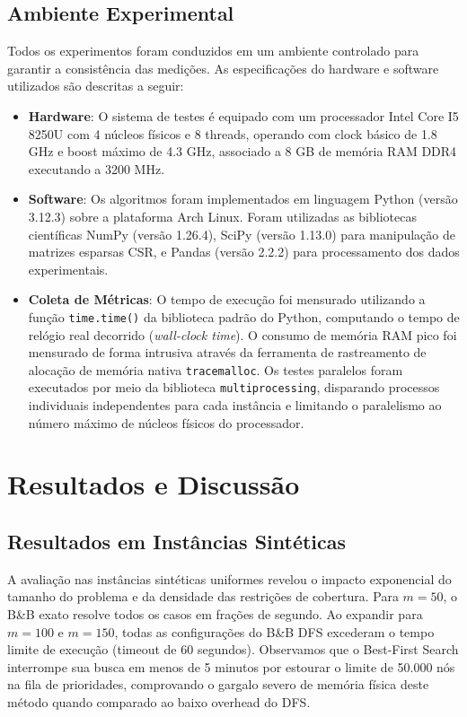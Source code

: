 \documentclass[conference]{IEEEtran}
\begin{document}
\subsection{Ambiente Experimental}
Todos os experimentos foram conduzidos em um ambiente controlado para garantir a consistência das medições. As especificações do hardware e software utilizados são descritas a seguir:
\begin{itemize}
\item \textbf{Hardware}: O sistema de testes é equipado com um processador Intel Core I5 8250U com 4 núcleos físicos e 8 threads, operando com clock básico de 1.8 GHz e boost máximo de 4.3 GHz, associado a 8 GB de memória RAM DDR4 executando a 3200 MHz.
\item \textbf{Software}: Os algoritmos foram implementados em linguagem Python (versão 3.12.3) sobre a plataforma Arch Linux. Foram utilizadas as bibliotecas científicas NumPy (versão 1.26.4), SciPy (versão 1.13.0) para manipulação de matrizes esparsas CSR, e Pandas (versão 2.2.2) para processamento dos dados experimentais.
\item \textbf{Coleta de Métricas}: O tempo de execução foi mensurado utilizando a função \texttt{time.time()} da biblioteca padrão do Python, computando o tempo de relógio real decorrido (\textit{wall-clock time}). O consumo de memória RAM pico foi mensurado de forma intrusiva através da ferramenta de rastreamento de alocação de memória nativa \texttt{tracemalloc}. Os testes paralelos foram executados por meio da biblioteca \texttt{multiprocessing}, disparando processos individuais independentes para cada instância e limitando o paralelismo ao número máximo de núcleos físicos do processador.
\end{itemize}

\section{Resultados e Discussão}

\subsection{Resultados em Instâncias Sintéticas}
A avaliação nas instâncias sintéticas uniformes revelou o impacto exponencial do tamanho do problema e da densidade das restrições de cobertura. Para $m=50$, o B\&B exato resolve todos os casos em frações de segundo. Ao expandir para $m=100$ e $m=150$, todas as configurações do B\&B DFS excederam o tempo limite de execução (timeout de 60 segundos). Observamos que o Best-First Search interrompe sua busca em menos de 5 minutos por estourar o limite de 50.000 nós na fila de prioridades, comprovando o gargalo severo de memória física deste método quando comparado ao baixo overhead do DFS.
\end{document}
